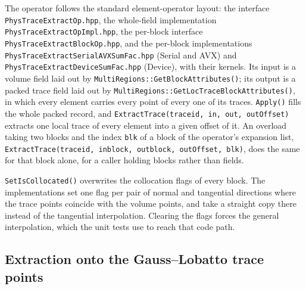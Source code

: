 The operator follows the standard element-operator layout: the interface
\texttt{PhysTraceExtractOp.hpp}, the whole-field implementation
\texttt{PhysTraceExtractOpImpl.hpp}, the per-block interface
\texttt{PhysTraceExtractBlockOp.hpp}, and the per-block implementations
\texttt{PhysTraceExtractSerialAVXSumFac.hpp} (Serial and AVX) and
\texttt{PhysTraceExtractDeviceSumFac.hpp} (Device), with their kernels.
Its input is a volume field laid out by
\texttt{MultiRegions::GetBlockAttributes()}; its output is a packed trace
field laid out by \texttt{MultiRegions::GetLocTraceBlockAttributes()}, in
which every element carries every point of every one of its traces.
\texttt{Apply()} fills the whole packed record, and
\texttt{ExtractTrace(traceid, in, out, outOffset)} extracts one local trace
of every element into a given offset of it. An overload taking two blocks
and the index \texttt{blk} of a block of the operator's expansion list,
\texttt{ExtractTrace(traceid, inblock, outblock, outOffset, blk)}, does the
same for that block alone, for a caller holding blocks rather than fields.

\texttt{SetIsCollocated()} overwrites the collocation flags of every block.
The implementations set one flag per pair of normal and tangential
directions where the trace points coincide with the volume points, and take
a straight copy there instead of the tangential interpolation. Clearing the
flags forces the general interpolation, which the unit tests use to reach
that code path.

\subsection{Extraction onto the Gauss--Lobatto trace points}
\label{sec:phystraceextract-gll}

